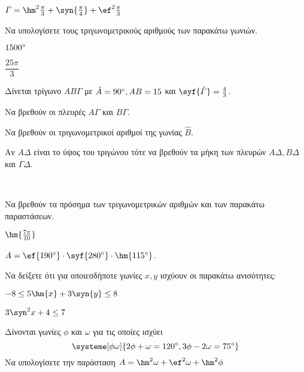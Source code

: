 \documentclass[twoside,nofonts,ektypwsh]{frontisthrio-diag}
\begin{document}
\begin{thema}
\begin{erwthma}
\begin{alist}
\item $ \varGamma=\hm^2{\frac{\pi}{3}}+\syn{\frac{\pi}{4}}+\ef^2{\frac{\pi}{3}} $
\end{alist}
\item Να υπολογίσετε τους τριγωνομετρικούς αριθμούς των παρακάτω γωνιών.
\begin{multicols}{2}
\begin{alist}
\item $ 1500\degree $
\item $ \dfrac{25\pi}{3} $
\end{alist}
\end{multicols}
\end{erwthma}
\item Δίνεται τρίγωνο $ AB\varGamma $ με $ \hat{A}=90\degree, AB=15 $ και $ \syf{\hat{\varGamma}}=\frac{4}{3} $.
\begin{erwthma}
\item Να βρεθούν οι πλευρές $ A\varGamma $ και $ B\varGamma $.
\item Να βρεθούν οι τριγωνομετρικοί αριθμοί της γωνίας $ \hat{B} $.
\item Αν $ A\varDelta $ είναι το ύψος του τριγώνου τότε να βρεθούν τα μήκη των πλευρών $ A\varDelta,B\varDelta $ και $ \varGamma\varDelta $.
\end{erwthma}
\item\mbox{}\\\vspace{-7mm}
\begin{erwthma}
\item Να βρεθούν τα πρόσημα των τριγωνομετρικών αριθμών και των παρακάτω παραστάσεων.
\begin{alist}
\item $ \hm{\frac{7\pi}{10}} $
\item $ A=\ef{190\degree}\cdot\syf{280\degree}\cdot\hm{115\degree} $.
\end{alist}
\item Να δείξετε ότι για οποιεσδήποτε γωνίες $ x,y $ ισχύουν οι παρακάτω ανισότητες:
\begin{alist}
\item $ -8\leq 5\hm{x}+3\syn{y}\leq 8 $
\item $ 3\syn^2{x}+4\leq 7 $
\end{alist}
\item Δίνονται γωνίες $ \phi $ και $ \omega $ για τις οποίες ισχύει
\[ \systeme[\phi\omega]{2\phi+\omega=120\degree,3\phi-2\omega=75\degree} \]
Να υπολογίσετε την παράσταση $ A=\hm^2{\omega}+\ef^2{\omega}+\hm^2{\phi} $
\end{erwthma}
\end{thema}
\end{document}
